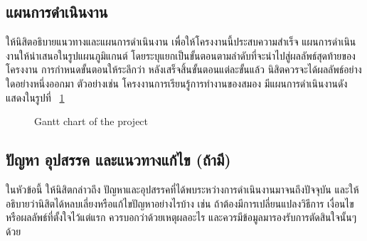 \documentclass[11pt,a4paper]{article}
\begin{document}
\subsection{แผนการดำเนินงาน}
ให้นิสิตอธิบายแนวทางและแผนการดำเนินงาน เพื่อให้โครงงานนี้ประสบความสำเร็จ แผนการดำเนินงานให้นำเสนอในรูปแผนภูมิแกนต์ โดยระบุแยกเป็นขั้นตอนตามลำดับที่จะนำไปสู่ผลลัพธ์สุดท้ายของโครงงาน การกำหนดขั้นตอนให้ระลึกว่า หลังเสร็จสิ้นขั้นตอนแต่ละขั้นแล้ว นิสิตควรจะได้ผลลัพธ์อย่างใดอย่างหนึ่งออกมา ตัวอย่างเช่น โครงงานการเรียนรู้การทำงานของสมอง มีแผนการดำเนินงานดังแสดงในรูปที่ ~\ref{fig:gantt}
\begin{figure}[h]
    \noindent{}
    \caption{\label{fig:gantt} Gantt chart of the project}
\end{figure}

\subsection{ปัญหา อุปสรรค และแนวทางแก้ไข (ถ้ามี)}
ในหัวข้อนี้ ให้นิสิตกล่าวถึง ปัญหาและอุปสรรคที่ได้พบระหว่างการดำเนินงานมาจนถึงปัจจุบัน และให้อธิบายว่านิสิตได้หลบเลี่ยงหรือแก้ไขปัญหาอย่างไรบ้าง เช่น ถ้าต้องมีการเปลี่ยนแปลงวิธีการ เงื่อนไข หรือผลลัพธ์ที่ตั้งใจไว้แต่แรก ควรบอกว่าด้วยเหตุผลอะไร และควรมีข้อมูลมารองรับการตัดสินใจนั้นๆ ด้วย
\end{document}
